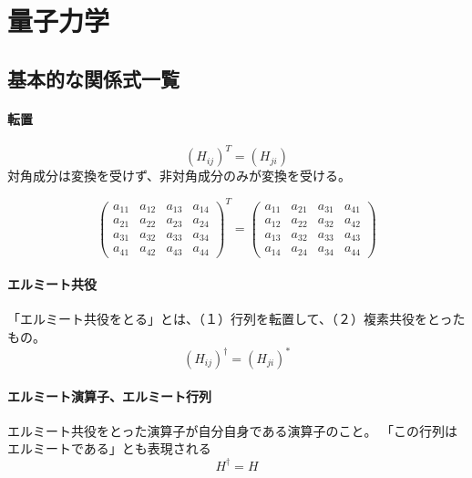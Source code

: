 \chapter{量子力学}
\section{基本的な関係式一覧}

\subsubsection{転置}
\begin{equation}
  (H_{ij})^{T}=(H_{ji})
\end{equation}
対角成分は変換を受けず、非対角成分のみが変換を受ける。

\begin{equation}
  \left(
    \begin{array}{cccc}
      a_{11} & a_{12} & a_{13} & a_{14} \\
      a_{21} & a_{22} & a_{23} & a_{24} \\
      a_{31} & a_{32} & a_{33} & a_{34} \\
      a_{41} & a_{42} & a_{43} & a_{44} 
    \end{array}
  \right)
    ^{T}
    =
  \left(
    \begin{array}{cccc}
      a_{11} & a_{21} & a_{31} & a_{41} \\
      a_{12} & a_{22} & a_{32} & a_{42} \\
      a_{13} & a_{32} & a_{33} & a_{43} \\
      a_{14} & a_{24} & a_{34} & a_{44} 
    \end{array}
  \right)
\end{equation}

\subsubsection{エルミート共役}
「エルミート共役をとる」とは、（１）行列を転置して、（２）複素共役をとったもの。
\begin{equation}
  (H_{ij})^{\dagger}=(H_{ji})^{*}
\end{equation}


\subsubsection{エルミート演算子、エルミート行列}
エルミート共役をとった演算子が自分自身である演算子のこと。
「この行列はエルミートである」とも表現される
\begin{equation}
H^{\dagger}=H
\end{equation}

